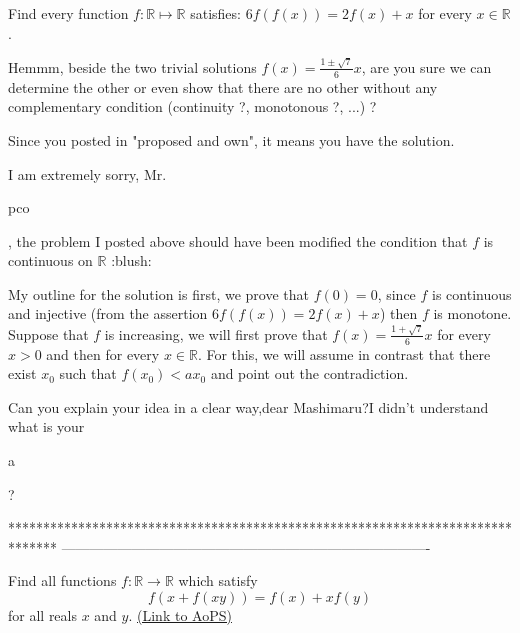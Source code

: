 \begin{solution}
	\begin{tcolorbox}Find every function $ f: \mathbb{R}\mapsto \mathbb{R}$ satisfies: $ 6f(f(x)) = 2f(x) + x$ for every $ x\in \mathbb{R}$.\end{tcolorbox}

Hemmm, beside the two trivial solutions $ f(x)=\frac{1\pm\sqrt 7}6x$, are you sure we can determine the other or even show that there are no other without any complementary condition (continuity ?, monotonous ?, ...) ?

Since you posted in "proposed and own", it means you have the solution.
\end{solution}



\begin{solution}
	I am extremely sorry, Mr.\begin{bolded}pco\end{bolded}, the problem I posted above should have been modified the condition that $ f$ is continuous on $ \mathbb{R}$  :blush:

My outline for the solution is first, we prove that $ f(0) = 0$, since $ f$ is continuous and injective (from the assertion $ 6f(f(x)) = 2f(x) + x$) then $ f$ is monotone. Suppose that $ f$ is increasing, we will first prove that $ f(x) = \frac{1+\sqrt{7}}{6}x$ for every $ x>0$ and then for every $ x\in\mathbb{R}$. For this, we will assume in contrast that there exist $ x_0$ such that $ f(x_0) < ax_0$ and point out the contradiction.
\end{solution}



\begin{solution}
	Can you explain your idea in a clear way,dear Mashimaru?I didn't understand what is your  \begin{bolded}a\end{bolded}?
\end{solution}
*******************************************************************************
-------------------------------------------------------------------------------

\begin{problem}
	Find all functions $f: \mathbb R \to \mathbb R$ which satisfy \[f( x + f ( xy ) )= f( x ) + x f( y ) \] for all reals $x$ and $y$.
	\flushright \href{https://artofproblemsolving.com/community/c6h306696}{(Link to AoPS)}
\end{problem}



